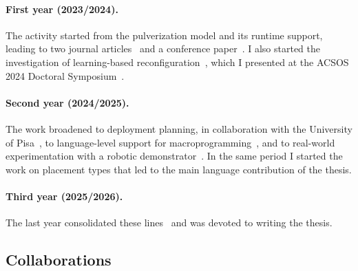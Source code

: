 \documentclass[a4paper,11pt]{article}
\begin{document}
\paragraph{First year (2023/2024).}
The activity started from the pulverization model and its runtime support, leading to two journal articles~\cite{DBLP:journals/fgcs/FarabegoliPCV24,DBLP:journals/iot/FarabegoliPCV24} and a conference paper~\cite{DBLP:conf/acsos/FarabegoliVC24}.
%
I also started the investigation of learning-based reconfiguration~\cite{DBLP:conf/woa/DominiFAV24}, which I presented at the ACSOS 2024 Doctoral Symposium~\cite{DBLP:conf/acsos/Farabegoli24}.

\paragraph{Second year (2024/2025).}
The work broadened to deployment planning, in collaboration with the University of Pisa~\cite{DBLP:conf/coordination/BrogiCFFV25},
to language-level support for macroprogramming~\cite{DBLP:journals/tiot/AguzziFV25},
and to real-world experimentation with a robotic demonstrator~\cite{DBLP:conf/coordination/AguzziBBCCDFPV25}.
%
In the same period I started the work on placement types that led to the main language contribution of the thesis.

\paragraph{Third year (2025/2026).}
The last year consolidated these lines~\cite{farabegoli2026capabilities,DBLP:conf/coordination/FarabegoliTAV26,DBLP:journals/fgcs/FarabegoliDAV26,farabegoli2027emerge}
and was devoted to writing the thesis.

\subsection{Collaborations}
\label{sec:collaborations}
\end{document}
